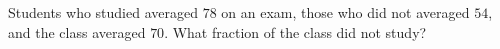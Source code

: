 Students who studied averaged $78$ on an exam, those who did not averaged $54$, and the class averaged $70$. What fraction of the class did not study?
